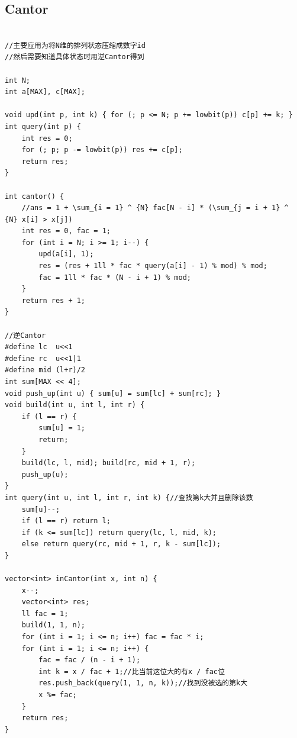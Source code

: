 \documentclass[twoside]{article}
\begin{document}
\subsection{Cantor}
\begin{lstlisting}
  
//主要应用为将N维的排列状态压缩成数字id
//然后需要知道具体状态时用逆Cantor得到

int N;
int a[MAX], c[MAX];

void upd(int p, int k) { for (; p <= N; p += lowbit(p)) c[p] += k; }
int query(int p) {
    int res = 0;
    for (; p; p -= lowbit(p)) res += c[p];
    return res;
}

int cantor() {
    //ans = 1 + \sum_{i = 1} ^ {N} fac[N - i] * (\sum_{j = i + 1} ^ {N} x[i] > x[j])
    int res = 0, fac = 1;
    for (int i = N; i >= 1; i--) {
        upd(a[i], 1);
        res = (res + 1ll * fac * query(a[i] - 1) % mod) % mod;
        fac = 1ll * fac * (N - i + 1) % mod;
    }
    return res + 1;
}

//逆Cantor
#define lc  u<<1
#define rc  u<<1|1
#define mid (l+r)/2
int sum[MAX << 4];
void push_up(int u) { sum[u] = sum[lc] + sum[rc]; }
void build(int u, int l, int r) {
    if (l == r) {
        sum[u] = 1;
        return;
    }
    build(lc, l, mid); build(rc, mid + 1, r);
    push_up(u);
}
int query(int u, int l, int r, int k) {//查找第k大并且删除该数
    sum[u]--;
    if (l == r) return l;
    if (k <= sum[lc]) return query(lc, l, mid, k);
    else return query(rc, mid + 1, r, k - sum[lc]);
}

vector<int> inCantor(int x, int n) {
    x--;
    vector<int> res;
    ll fac = 1;
    build(1, 1, n);
    for (int i = 1; i <= n; i++) fac = fac * i;
    for (int i = 1; i <= n; i++) {
        fac = fac / (n - i + 1);
        int k = x / fac + 1;//比当前这位大的有x / fac位
        res.push_back(query(1, 1, n, k));//找到没被选的第k大
        x %= fac;
    }
    return res;
}\end{lstlisting}
\end{document}
